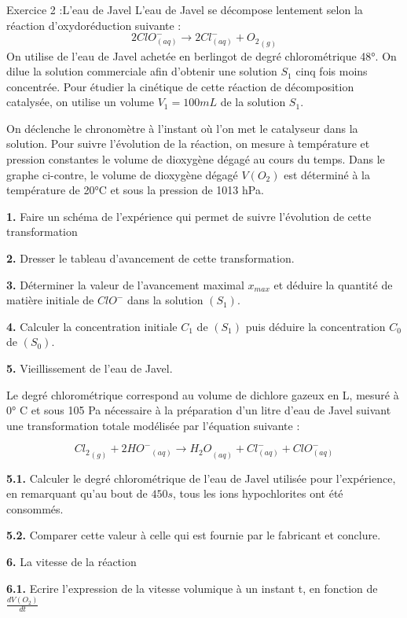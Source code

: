 \documentclass[12pt, french]{article}
\begin{document}
\begin{Box2}{Exercice 2 :L’eau de Javel }
L’eau de Javel se décompose lentement selon la réaction d’oxydoréduction suivante :
$$2ClO^-_{(aq)} \rightarrow 2Cl^-_{(aq)} + {O_2}_{(g)}$$
On utilise de l’eau de Javel achetée en berlingot de degré chlorométrique 48°. On dilue la solution
commerciale afin d’obtenir une solution $S_1$ cinq fois moins concentrée. Pour étudier la cinétique de cette
réaction de
décomposition catalysée, on utilise un volume $V_1 = 100 mL$ de la solution $S_1$. 

On déclenche le chronomètre
à l’instant où l’on met le catalyseur dans la solution. Pour suivre l’évolution de la réaction, on mesure à
température et pression constantes le volume de dioxygène dégagé au cours du temps. Dans le graphe ci-contre, le volume de dioxygène dégagé $V(O_2)$ est
déterminé à la température de 20°C et sous la
pression de 1013 hPa.

\textbf{1. }Faire un schéma de l'expérience qui permet de
suivre l'évolution de cette transformation

\textbf{2.} Dresser le tableau d’avancement de cette
transformation.

\textbf{3. } Déterminer la valeur de l’avancement maximal $x_{max}$ et déduire la quantité de matière initiale de
$ClO^-$ dans la solution $(S_1)$.

\textbf{4. } Calculer la concentration initiale $C_1$ de $(S_1)$ puis déduire la concentration $C_0$ de $(S_0)$.

\textbf{5. }Vieillissement de l’eau de Javel.

Le degré chlorométrique correspond au volume de dichlore gazeux en L, mesuré à 0° C et sous 105 Pa
nécessaire à la préparation d’un litre d’eau de Javel suivant une transformation totale modélisée par
l’équation suivante : 

$${Cl_2}_{(g)} + 2 {HO^-}_{(aq)} \rightarrow {H_2O}_{(aq)} + Cl^-_{(aq)} + ClO^-_{(aq)}$$

\textbf{5.1. } Calculer le degré chlorométrique de l’eau de Javel utilisée pour l’expérience, en remarquant
qu’au bout de $450s$, tous les ions hypochlorites ont été consommés.

\textbf{5.2. }Comparer cette valeur à celle qui est fournie par le fabricant et conclure.

\textbf{6. }La vitesse de la réaction

\textbf{6.1. }Ecrire l’expression de la vitesse volumique à un instant t, en fonction de $\frac{dV(O_2)}{dt}$


\end{Box2}
\end{document}
